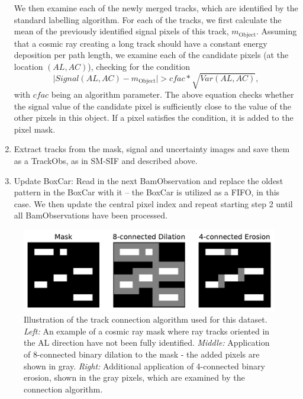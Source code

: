 \documentclass[a4paper, 11pt]{article}
\begin{document}
\begin{enumerate}
    We then examine each of the newly merged tracks, which are identified by the standard labelling algorithm. For each of the tracks, we first calculate the mean of the previously identified signal pixels of this track, $m_\mathrm{Object}$. Assuming that a cosmic ray creating a long track should have a constant energy deposition per path length, we examine each of the candidate pixels (at the location $\left(AL,AC\right)$), checking for the condition
    \begin{equation}
      \lvert Signal\left( AL,AC \right) - m_\mathrm{Object}\rvert > cfac * \sqrt{Var\left( AL,AC \right)},
    \end{equation}
    with $cfac$ being an algorithm parameter. The above equation checks whether the signal value of the candidate pixel is sufficiently close to the value of the other pixels in this object. If a pixel satisfies the condition, it is added to the pixel mask. 
  \item Extract tracks from the mask, signal and uncertainty images and save them as a TrackObs, as in SM-SIF and described above.
  \item Update BoxCar: Read in the next BamObservation and replace the oldest pattern in the BoxCar with it -- the BoxCar is utilized as a FIFO, in this case. We then update the central pixel index and repeat starting step 2 until all BamObservations have been processed.
\end{enumerate}

\begin{figure}
  \centering
  \includegraphics{images/extraction/BAM-OBS_connection}
  \caption{Illustration of the track connection algorithm used for this dataset. \textit{Left:} An example of a cosmic ray mask where ray tracks oriented in the AL direction have not been fully identified. \textit{Middle:} Application of 8-connected binary dilation to the mask - the added pixels are shown in gray. \textit{Right:} Additional application of 4-connected binary erosion, shown in the gray pixels, which are examined by the connection algorithm.}
  \label{fig:BAM_connection}
\end{figure}
\end{document}
